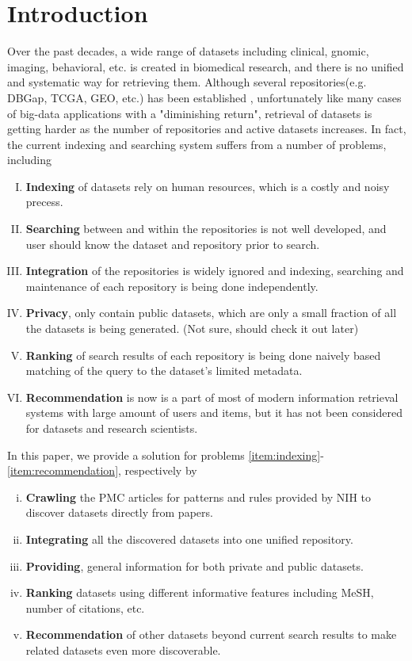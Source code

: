 \documentclass{amia}
\begin{document}
\section*{Introduction}

\label{sec:introduction}
Over the past decades, a wide range of datasets including clinical, gnomic, imaging, behavioral, etc. is created in biomedical research, and there is no unified and systematic way for retrieving them. Although several repositories(e.g. DBGap, TCGA, GEO, etc.) has been established \cite{nih-repo}, unfortunately like many cases of big-data applications with a "diminishing return", retrieval of datasets is getting harder as the number of repositories and active datasets increases. In fact, the current indexing and searching system suffers from a number of problems, including
\begin{enumerate}[(I)]
	\item {\bf Indexing} of datasets rely on human resources, which is a costly and noisy precess. \label{item:indexing}
	\item {\bf Searching} between and within the repositories is not well developed, and user should know the dataset and repository prior to search.
	\item {\bf Integration} of the repositories is widely ignored and indexing, searching and maintenance of each repository is being done independently.
	\item {\bf Privacy}, only contain public datasets, which are only a small fraction of all the datasets is being generated. (Not sure, should check it out later)
	\item {\bf Ranking} of search results of each repository is being done naively based matching of the query to the dataset's limited metadata.
	\item {\bf Recommendation} is now is a part of most of modern information retrieval systems with large amount of users and items, but it has not been considered for datasets and research scientists. \label{item:recommendation}
\end{enumerate}

In this paper, we provide a solution for problems \eqref{item:indexing}-\eqref{item:recommendation}, respectively by
\begin{enumerate}[(i)]
	\item {\bf Crawling} the PMC articles for patterns and rules provided by NIH to discover datasets directly from papers. \label{item:crawiling}
	\item {\bf Integrating} all the discovered datasets into one unified repository. \label{item:integrating}
	\item {\bf Providing}, general information for both private and public datasets.
	\item {\bf Ranking} datasets using different informative features including MeSH, number of citations, etc.
	\item {\bf Recommendation} of other datasets beyond current search results to make related datasets even more discoverable. \label{item:recommendation-sol}
\end{enumerate}
\end{document}
